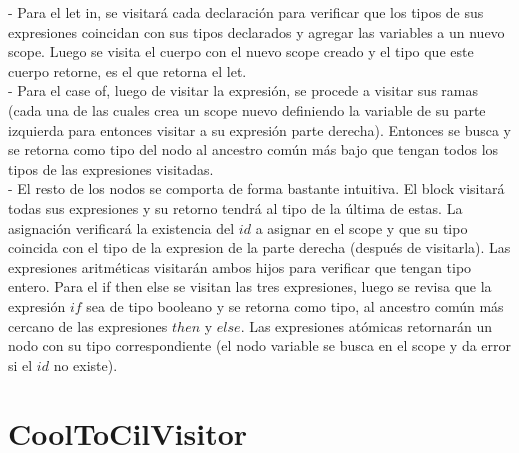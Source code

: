 \documentclass[a4paper,12pt]{article}
\begin{document}
- Para el let in, se visitará cada declaración para verificar que los tipos de sus expresiones coincidan con sus tipos declarados y agregar las variables a un nuevo scope. Luego se visita el cuerpo con el nuevo scope creado y el tipo que este cuerpo retorne, es el que retorna el let.\\

- Para el case of, luego de visitar la expresión, se procede a visitar sus ramas (cada una de las cuales crea un scope nuevo definiendo la variable de su parte izquierda para entonces visitar a su expresión parte derecha). Entonces se busca y se retorna como tipo del nodo al ancestro común más bajo que tengan todos los tipos de las expresiones visitadas.\\

- El resto de los nodos se comporta de forma bastante intuitiva. El block visitará todas sus expresiones y su retorno tendrá al tipo de la última de estas. La asignación verificará la existencia del $id$ a asignar en el scope y que su tipo coincida con el tipo de la expresion de la parte derecha (después de visitarla). Las expresiones aritméticas visitarán ambos hijos para verificar que tengan tipo entero. Para el if then else se visitan las tres expresiones, luego se revisa que la expresión $if$ sea de tipo booleano y se retorna como tipo, al ancestro común más cercano de las expresiones $then$ y $else$. Las expresiones atómicas retornarán un nodo con su tipo correspondiente (el nodo variable se busca en el scope y da error si el $id$ no existe).

\section*{CoolToCilVisitor}
\end{document}
